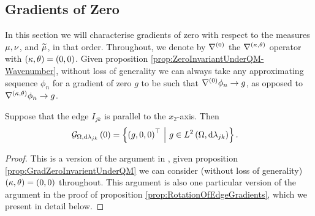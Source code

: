 \subsection{Gradients of Zero} \label{ssec:muGradZero}
In this section we will characterise gradients of zero with respect to the measures $\mu, \nu$, and $\widetilde{\mu}$, in that order.
Throughout, we denote by $\nabla^{(0)}$ the $\nabla^{\left( \kappa, \theta \right)}$ operator with $\left( \kappa, \theta \right)=\left( 0,0 \right)$.
Given proposition \ref{prop:ZeroInvariantUnderQM-Wavenumber}, without loss of generality we can always take any approximating sequence $\phi_n$ for a gradient of zero $g$ to be such that $\nabla^{(0)}\phi_n\rightarrow g$, as opposed to $\nabla^{\left( \kappa, \theta \right)}\phi_n\rightarrow g$.
\begin{prop} \label{prop:3DGradZeroParallel}
	Suppose that the edge $I_{jk}$ is parallel to the $x_2$-axis.
	Then 
	\begin{align*}
		\mathcal{G}_{ \Omega, \mathrm{d}\lambda_{jk}}\left( 0 \right) &= 
		\left\{  \left( g,0,0 \right)^\top	\ \middle\vert \  g\in L^{2}\left( \Omega,\mathrm{d}\lambda_{jk} \right)  \right\}.
	\end{align*}
\end{prop}
\begin{proof}
	This is a version of the argument in \cite[Section~3.1]{zhikov2000extension}, given proposition \ref{prop:GradZeroInvarientUnderQM} we can consider (without loss of generality) $\left( \kappa, \theta \right)=\left( 0,0 \right)$ throughout.
	This argument is also one particular version of the argument in the proof of proposition \ref{prop:RotationOfEdgeGradients}, which we present in detail below.
\end{proof}

